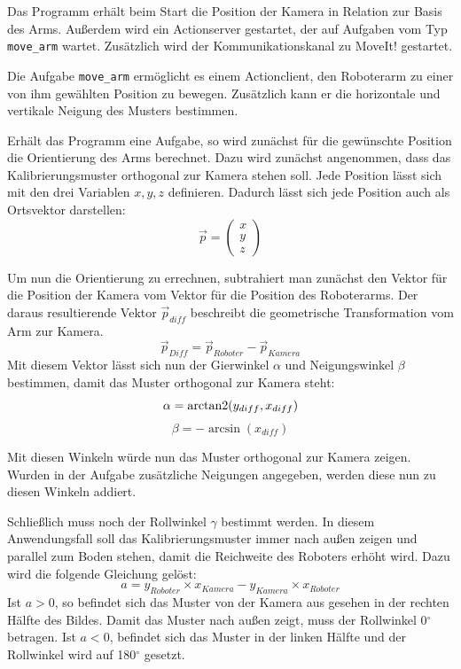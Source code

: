 Das Programm erhält beim Start die Position der Kamera in Relation zur Basis des Arms. Außerdem wird ein Actionserver gestartet, der auf Aufgaben vom Typ \texttt{move\_arm} wartet. Zusätzlich wird der Kommunikationskanal zu MoveIt! gestartet.

Die Aufgabe \texttt{move\_arm} ermöglicht es einem Actionclient, den Roboterarm zu einer von ihm gewählten Position zu bewegen. Zusätzlich kann er die horizontale und vertikale Neigung des Musters bestimmen.

Erhält das Programm eine Aufgabe, so wird zunächst für die gewünschte Position die Orientierung des Arms berechnet. Dazu wird zunächst angenommen, dass das Kalibrierungsmuster orthogonal zur Kamera stehen soll. Jede Position lässt sich mit den drei Variablen $x, y, z$ definieren. Dadurch lässt sich jede Position auch als Ortsvektor darstellen:
\begin{equation}
	\vec{p} = 
	\begin{pmatrix}
		x\\
		y\\
		z
	\end{pmatrix}
\end{equation}

Um nun die Orientierung zu errechnen, subtrahiert man zunächst den Vektor für die Position der Kamera vom Vektor für die Position des Roboterarms. Der daraus resultierende Vektor $\vec{p}_{diff}$ beschreibt die geometrische Transformation vom Arm zur Kamera. 
\begin{equation}\label{eq:diff}
	\vec{p}_{Diff} = \vec{p}_{Roboter} - \vec{p}_{Kamera}
\end{equation}
Mit diesem Vektor lässt sich nun der Gierwinkel $\alpha$ und Neigungswinkel $\beta$ bestimmen, damit das Muster orthogonal zur Kamera steht:
\begin{equation}\label{eq:pitch}
	\alpha = \operatorname{arctan2}(y_{diff}, x_{diff})
\end{equation}
\begin{equation}\label{eq:yaw}
	\beta = -\arcsin(x_{diff})
\end{equation}

Mit diesen Winkeln würde nun das Muster orthogonal zur Kamera zeigen. Wurden in der Aufgabe zusätzliche Neigungen angegeben, werden diese nun zu diesen Winkeln addiert.

Schließlich muss noch der Rollwinkel $\gamma$ bestimmt werden. In diesem Anwendungsfall soll das Kalibrierungsmuster immer nach außen zeigen und parallel zum Boden stehen, damit die Reichweite des Roboters erhöht wird. Dazu wird die folgende Gleichung gelöst:
\begin{equation}
	a = y_{Roboter} \times x_{Kamera} - y_{Kamera} \times x_{Roboter}
\end{equation}
Ist $a > 0$, so befindet sich das Muster von der Kamera aus gesehen in der rechten Hälfte des Bildes. Damit das Muster nach außen zeigt, muss der Rollwinkel 0$^\circ$ betragen. Ist $a < 0$, befindet sich das Muster in der linken Hälfte und der Rollwinkel wird auf 180$^\circ$ gesetzt.

